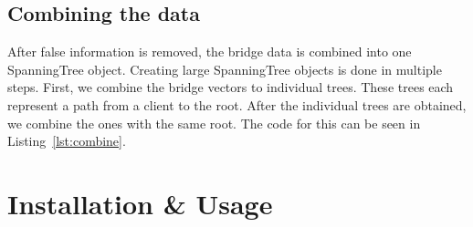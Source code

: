 \subsection{Combining the data}
\label{combining_data}
After false information is removed, the bridge data is combined into one SpanningTree object.
Creating large SpanningTree objects is done in multiple steps.
First, we combine the bridge vectors to individual trees.
These trees each represent a path from a client to the root.
After the individual trees are obtained, we combine the ones with the same root.
The code for this can be seen in Listing~\ref{lst:combine}.


\section{Installation \& Usage}

